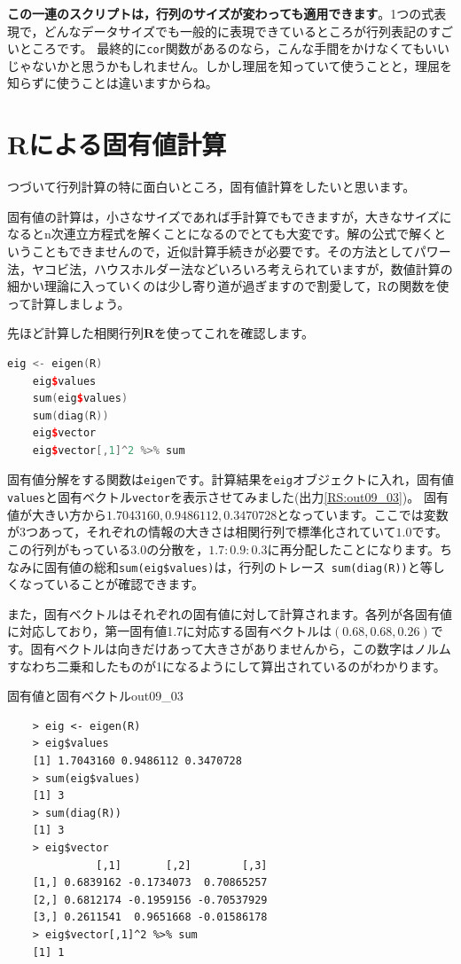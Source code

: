 \documentclass{ltjsbook}
\begin{document}
\textbf{この一連のスクリプトは，行列のサイズが変わっても適用できます}。1つの式表現で，どんなデータサイズでも一般的に表現できているところが行列表記のすごいところです。
最終的に\texttt{cor}関数があるのなら，こんな手間をかけなくてもいいじゃないかと思うかもしれません。しかし理屈を知っていて使うことと，理屈を知らずに使うことは違いますからね。

\section{Rによる固有値計算}
つづいて行列計算の特に面白いところ，固有値計算をしたいと思います。

固有値の計算は，小さなサイズであれば手計算でもできますが，大きなサイズになるとn次連立方程式を解くことになるのでとても大変です。解の公式で解くということもできませんので，近似計算手続きが必要です。その方法としてパワー法，ヤコビ法，ハウスホルダー法などいろいろ考えられていますが，数値計算の細かい理論に入っていくのは少し寄り道が過ぎますので割愛して，Rの関数を使って計算しましょう。

先ほど計算した相関行列$\bm{R}$を使ってこれを確認します。

\begin{lstlisting}[language=c++,label={code::09_08},caption={相関行列の固有値分解}]
    eig <- eigen(R)
    eig$values
    sum(eig$values)
    sum(diag(R))
    eig$vector
    eig$vector[,1]^2 %>% sum
\end{lstlisting}

固有値分解をする関数は\texttt{eigen}です。計算結果を\texttt{eig}オブジェクトに入れ，固有値\verb|values|と固有ベクトル\verb|vector|を表示させてみました(出力\ref{RS:out09_03})。
固有値が大きい方から$1.7043160,0.9486112,0.3470728$となっています。ここでは変数が3つあって，それぞれの情報の大きさは相関行列で標準化されていて$1.0$です。この行列がもっている$3.0$の分散を，$1.7 : 0.9 : 0.3$に再分配したことになります。ちなみに固有値の総和\verb|sum(eig$values)|は，行列のトレース\verb| sum(diag(R))|と等しくなっていることが確認できます。

また，固有ベクトルはそれぞれの固有値に対して計算されます。各列が各固有値に対応しており，第一固有値1.7に対応する固有ベクトルは$(0.68,0.68,0.26)$です。固有ベクトルは向きだけあって大きさがありませんから，この数字はノルムすなわち二乗和したものが1になるようにして算出されているのがわかります。
\begin{Rscreen}{固有値と固有ベクトル}{out09_03}
\begin{verbatim}
    > eig <- eigen(R)
    > eig$values
    [1] 1.7043160 0.9486112 0.3470728
    > sum(eig$values)
    [1] 3
    > sum(diag(R))
    [1] 3
    > eig$vector
              [,1]       [,2]        [,3]
    [1,] 0.6839162 -0.1734073  0.70865257
    [2,] 0.6812174 -0.1959156 -0.70537929
    [3,] 0.2611541  0.9651668 -0.01586178
    > eig$vector[,1]^2 %>% sum
    [1] 1
\end{verbatim}
\end{Rscreen}
\end{document}
